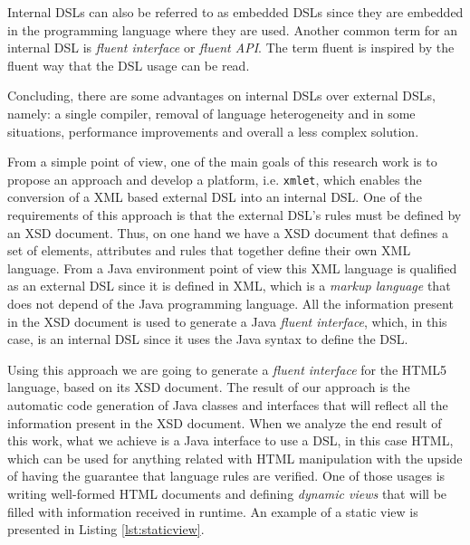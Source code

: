 \noindent
Internal \ac{DSL}s can also be referred to as embedded \ac{DSL}s since they are embedded in the programming language where they are used. Another common term for an internal \ac{DSL} is \textit{fluent interface} or \textit{fluent \ac{API}}. The term fluent is inspired by the fluent way that the \ac{DSL} usage can be read.

\noindent
Concluding, there are some advantages on internal \ac{DSL}s over external \ac{DSL}s, namely: a single compiler, removal of language heterogeneity and in some situations, performance improvements and overall a less complex solution.

\noindent
From a simple point of view, one of the main goals of this research work is to propose an approach and develop a platform, i.e. \texttt{xmlet}, which enables the conversion of a \ac{XML} based external \ac{DSL} into an internal \ac{DSL}. One of the requirements of this approach is that the external \ac{DSL}'s rules must be defined by an \ac{XSD} document. Thus, on one hand we have a \ac{XSD} document that defines a set of elements, attributes and rules that together define their own \ac{XML} language. From a Java environment point of view this \ac{XML} language is qualified as an external \ac{DSL} since it is defined in \ac{XML}, which is a \textit{markup language} that does not depend of the Java programming language. All the information present in the \ac{XSD} document is used to generate a Java \textit{fluent interface}, which, in this case, is an internal \ac{DSL} since it uses the Java syntax to define the \ac{DSL}. 

\noindent
Using this approach we are going to generate a \textit{fluent interface} for the \ac{HTML}5 language, based on its \ac{XSD} document. The result of our approach is the automatic code generation of Java classes and interfaces that will reflect all the information present in the \ac{XSD} document. When we analyze the end result of this work, what we achieve is a Java interface to use a \ac{DSL}, in this case \ac{HTML}, which can be used for anything related with \ac{HTML} manipulation with the upside of having the guarantee that language rules are verified. One of those usages is writing well-formed \ac{HTML} documents and defining \textit{dynamic views} that will be filled with information received in runtime. An example of a static view is presented in Listing \ref{lst:staticview}.

\bigskip



